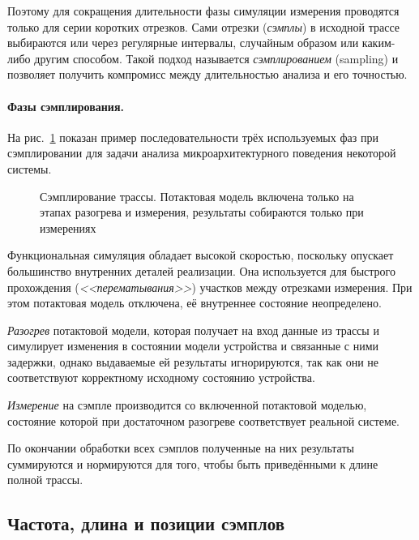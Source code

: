 Поэтому для сокращения длительности фазы симуляции измерения проводятся только для серии коротких отрезков. Сами отрезки (\textit{сэмплы}) в исходной трассе выбираются или через регулярные интервалы, случайным образом или каким-либо другим способом. Такой подход называется \textit{сэмплированием} (\abbr sampling) и позволяет получить компромисс между длительностью анализа и его точностью.

\paragraph{Фазы сэмплирования.} На рис.~\ref{fig:trace-warmup} показан пример последовательности трёх используемых фаз при сэмплировании для задачи анализа микроархитектурного поведения некоторой системы.

\begin{figure}[htbp]
    \centering
    \caption[Сэмплирование трассы]{Сэмплирование трассы. Потактовая модель включена только на этапах разогрева и измерения, результаты собираются только при измерениях}
    \label{fig:trace-warmup}
\end{figure}


\begin{itemize*}
    \item Функциональная симуляция обладает высокой скоростью, поскольку опускает большинство внутренних деталей реализации. Она используется для быстрого прохождения (\textit{<<перематывания>>}) участков между отрезками измерения. При этом потактовая модель отключена, её внутреннее состояние неопределено.
    \item \textit{Разогрев} потактовой модели, которая получает на вход данные из трассы и симулирует изменения в состоянии модели устройства и связанные с ними задержки,  однако выдаваемые ей результаты игнорируются, так как они не соответствуют корректному исходному состоянию устройства. 
    \item \textit{Измерение} на сэмпле производится со включенной потактовой моделью, состояние которой при достаточном разогреве соответствует реальной системе.
    \item По окончании обработки всех сэмплов полученные на них результаты суммируются и нормируются для  того, чтобы быть приведёнными к длине полной трассы.
\end{itemize*}


\subsection{Частота, длина и позиции сэмплов}

